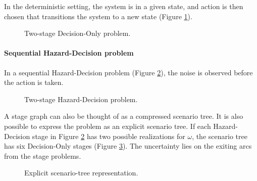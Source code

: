 \documentclass[final,1p,times]{elsarticle}
\newcommand{\drawHDsquiggle}[1]{\draw[-stealth, decoration={snake, amplitude = .4mm, segment length = 1.5mm, post length=0.9mm},decorate] (#1)+(-0.75, 0.5) -- (#1);}
\begin{document}
In the deterministic setting, the system is in a given state, and action is then chosen that transitions the system to a new state (Figure \ref{fig:det}).

\begin{figure}[!ht]
    \centering
{}
\caption{Two-stage Decision-Only problem.}
\label{fig:det}
\end{figure}

\paragraph{Sequential Hazard-Decision problem}

In a sequential Hazard-Decision problem (Figure \ref{fig:shd}), the noise is observed before the action is taken.

\begin{figure}[!ht]
    \centering
{}
\caption{Two-stage Hazard-Decision problem.}
\label{fig:shd}
\end{figure}

A stage graph can also be thought of as a compressed scenario tree. It is also possible to express the problem as an explicit scenario tree. If each Hazard-Decision stage in Figure \ref{fig:shd} has two possible realizations for $\omega$, the scenario tree has six Decision-Only stages (Figure \ref{fig:scenario}). The uncertainty lies on the exiting arcs from the stage problems.

\begin{figure}[!ht]
    \centering
{}
\caption{Explicit scenario-tree representation.}
\label{fig:scenario}
\end{figure}
\end{document}
